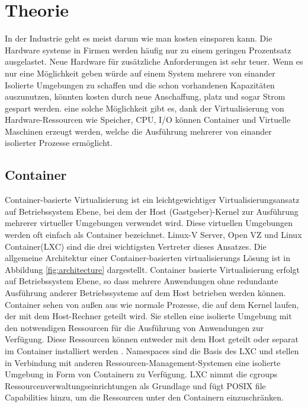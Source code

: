 \thispagestyle{empty}

\section{Theorie}

In der Industrie geht es meist darum wie man kosten einsparen kann. Die Hardware systeme in Firmen werden häufig nur zu einem geringen Prozentsatz ausgelastet. Neue Hardware für zusätzliche Anforderungen ist sehr teuer. Wenn es nur eine Möglichkeit geben würde auf einem System mehrere von einander Isolierte Umgebungen zu schaffen und die schon vorhandenen Kapazitäten auszunutzen, könnten kosten durch neue Anschaffung, platz und sogar Strom gespart werden. eine solche Möglichkeit gibt es, dank der Virtualisierung von Hardware-Ressourcen wie Speicher, CPU, I/O können Container und Virtuelle Maschinen erzeugt werden, welche die Ausführung mehrerer von einander isolierter Prozesse ermöglicht.

\subsection{Container}
Container-basierte Virtualisierung ist ein leichtgewichtiger Virtualisierungsansatz auf Betriebssystem Ebene, bei dem der Host (Gastgeber)-Kernel zur Ausführung mehrerer virtueller Umgebungen verwendet wird. Diese virtuellen Umgebungen werden oft einfach als \glqq Container \grqq{} bezeichnet. Linux-V Server\cite{Overview2018PaperLinux-VServer}, Open VZ\cite{IndexOpenvz.org} und Linux Container(LXC)\cite{IndexLinuxcontainers.Org} sind die drei wichtigsten Vertreter dieses Ansatzes. Die allgemeine Architektur einer Container-basierten virtualisierungs Lösung ist in Abbildung \ref{fig:architecture} dargestellt. Container basierte Virtualisierung erfolgt auf Betriebssystem Ebene, so dass mehrere Anwendungen ohne redundante Ausführung anderer Betriebssysteme auf dem Host betrieben werden können. Container sehen von außen aus wie normale Prozesse, die auf dem Kernel laufen, der mit dem Host-Rechner geteilt wird. Sie stellen eine isolierte Umgebung mit den notwendigen Ressourcen für die Ausführung von Anwendungen zur Verfügung. Diese Ressourcen können entweder mit dem Host geteilt oder separat im Container installiert werden \cite{Xavier2014AClusters}. Namespaces sind die Basis des LXC und stellen in Verbindung mit anderen Ressourcen-Management-Systemen eine isolierte Umgebung in Form von Containern zu Verfügung. LXC nimmt die cgroups Ressourcenverwaltungseinrichtungen\cite{Heo2015ControlV2} als Grundlage und fügt POSIX file Capabilities\cite{Overview2018PaperLinux-VServer} hinzu, um die Ressourcen unter den Containern einzuschränken. 

